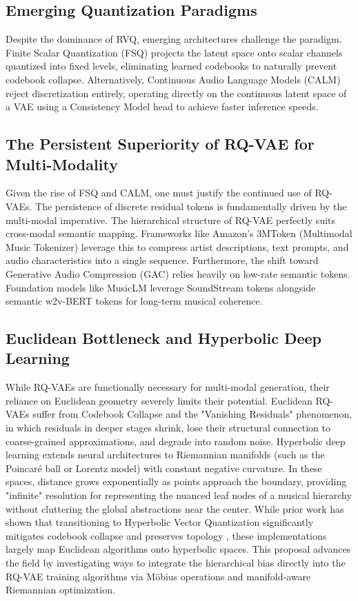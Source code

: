 \documentclass[12pt]{report}
\begin{document}
\subsection{Emerging Quantization Paradigms}
Despite the dominance of RVQ, emerging architectures challenge the paradigm. Finite Scalar Quantization (FSQ) \cite{finitescalarquantizationfsq} projects the latent space onto scalar channels quantized into fixed levels, eliminating learned codebooks to naturally prevent codebook collapse. Alternatively, Continuous Audio Language Models (CALM) \cite{calmcontinuousaudiolanguagemodels} reject discretization entirely, operating directly on the continuous latent space of a VAE using a Consistency Model head to achieve faster inference speeds.

\subsection{The Persistent Superiority of RQ-VAE for Multi-Modality}
Given the rise of FSQ and CALM, one must justify the continued use of RQ-VAEs. The persistence of discrete residual tokens is fundamentally driven by the multi-modal imperative. The hierarchical structure of RQ-VAE perfectly suits cross-modal semantic mapping. Frameworks like Amazon's 3MToken (Multimodal Music Tokenizer) \cite{3mtoken} leverage this to compress artist descriptions, text prompts, and audio characteristics into a single sequence. Furthermore, the shift toward Generative Audio Compression (GAC) \cite{gac} relies heavily on low-rate semantic tokens. Foundation models like MusicLM leverage SoundStream tokens alongside semantic w2v-BERT \cite{w2vbert} tokens for long-term musical coherence.

\subsection{Euclidean Bottleneck and Hyperbolic Deep Learning}
While RQ-VAEs are functionally necessary for multi-modal generation, their reliance on Euclidean geometry severely limits their potential. Euclidean RQ-VAEs suffer from Codebook Collapse \cite{collapse_1, collapse_2} and the "Vanishing Residuals" phenomenon, in which residuals in deeper stages shrink, lose their structural connection to coarse-grained approximations, and degrade into random noise.
Hyperbolic deep learning extends neural architectures to Riemannian manifolds (such as the Poincaré ball or Lorentz model) with constant negative curvature. In these spaces, distance grows exponentially as points approach the boundary, providing "infinite" resolution for representing the nuanced leaf nodes of a musical hierarchy without cluttering the global abstractions near the center. While prior work has shown that transitioning to Hyperbolic Vector Quantization significantly mitigates codebook collapse and preserves topology \cite{hrqvae, hypervq}, these implementations largely map Euclidean algorithms onto hyperbolic spaces. This proposal advances the field by investigating ways to integrate the hierarchical bias directly into the RQ-VAE training algorithms via Möbius operations and manifold-aware Riemannian optimization.
\end{document}
